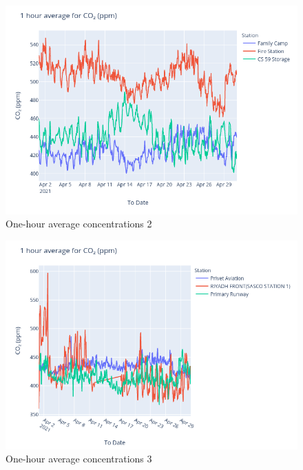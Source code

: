 \documentclass[12pt, oneside]{book}
\begin{document}
{\bigskip
{}
{\begin{figure}[H]
\centering
\includegraphics[width=\textwidth]{image200}
\caption{One-hour average  concentrations 2}\label{image200}
\end{figure}}{}

{\begin{figure}[H]
\centering
\includegraphics[width=\textwidth]{image212}
\caption{One-hour average  concentrations 3}\label{image212}
\end{figure}}{}

}
\end{document}
